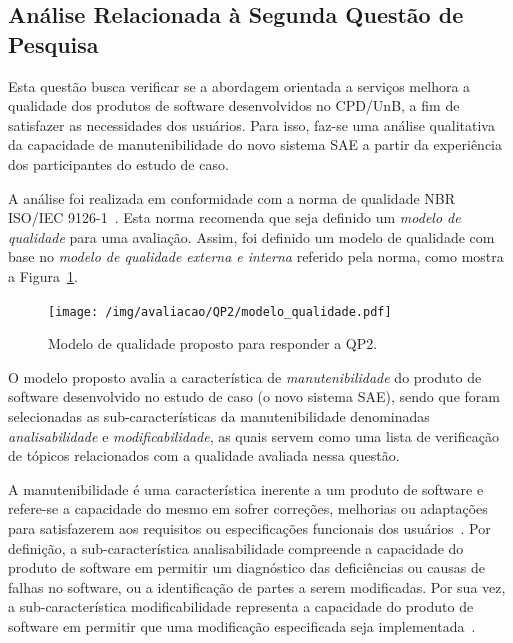 \subsection{Análise Relacionada à Segunda Questão de Pesquisa}

Esta questão busca verificar se a abordagem orientada a serviços melhora a qualidade dos produtos de software desenvolvidos no CPD/UnB, a fim de satisfazer as necessidades dos usuários. 
Para isso, faz-se uma análise qualitativa da capacidade de manutenibilidade do novo sistema \acrshort{SAE} a partir da experiência dos participantes do estudo de caso. 

A análise foi realizada em conformidade com a norma de qualidade NBR ISO/IEC 9126-1~\cite{iso2003iec}. Esta norma recomenda que seja definido um \emph{modelo de qualidade} para uma avaliação. Assim, foi definido um modelo de qualidade com base no \emph{modelo de qualidade externa e interna} referido pela norma, como mostra a Figura~\ref{fig:modelo_qualidade}. 



\begin{figure}[htb]
\centering
\texttt{[image: /img/avaliacao/QP2/modelo\_qualidade.pdf]}
\caption{Modelo de qualidade proposto para responder a QP2.}
\label{fig:modelo_qualidade}
\end{figure}

O modelo proposto avalia a característica de \emph{manutenibilidade} do
produto de software desenvolvido no estudo de caso (o novo sistema \acrshort{SAE}), 
sendo que foram selecionadas as sub-características da manutenibilidade denominadas
\emph{analisabilidade} e \emph{modificabilidade}, 
as quais servem como uma lista de verificação
de tópicos relacionados com a qualidade avaliada nessa questão. 

A manutenibilidade é uma característica inerente a um produto de software e refere-se a capacidade do mesmo em sofrer correções, melhorias ou adaptações para satisfazerem aos requisitos ou especificações funcionais dos usuários~\cite{iso2003iec, sant2003reuse}. Por definição, a sub-característica analisabilidade compreende a capacidade do produto de software em permitir um diagnóstico das deficiências ou causas de falhas no software, ou a identificação de partes a serem modificadas. Por sua vez, a sub-característica modificabilidade representa a capacidade do produto de software em permitir que uma modificação especificada seja implementada~\cite{iso2003iec}.

